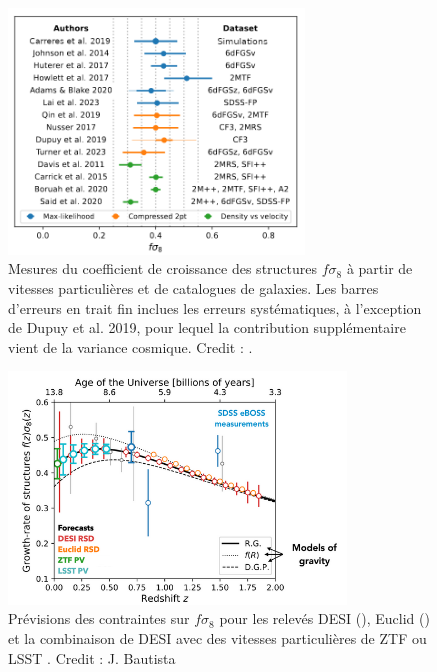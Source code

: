 \documentclass{book}
\begin{document}
\begin{figure}
    \centering
    \includegraphics[width=0.7\textwidth]{figures/Carreres_fig_11.png}
    \caption{Mesures du coefficient de croissance des structures $f\sigma_8$ à partir de vitesses particulières et de catalogues de galaxies. Les barres d'erreurs en trait fin inclues les erreurs systématiques, à l'exception de Dupuy et al. 2019, pour lequel la contribution supplémentaire vient de la variance cosmique. Credit : 
    \cite{carreres_growth-rate_2023}.}
    \label{fig:carreres_11}
\end{figure}

\begin{figure}
    \centering
    \includegraphics[width=0.8\textwidth]{figures/fs8.png}
    \caption{Prévisions des contraintes sur $f\sigma_8$ pour les relevés DESI (\cite{hahn_desi_2023}), Euclid (\cite{euclid_collaboration_euclid_2024}) et la combinaison de DESI avec des vitesses particulières de ZTF \cite{carreres_growth-rate_2023} ou LSST \cite{howlett_2mtf_2017}. Credit : J. Bautista}
    \label{fig:fs8}
\end{figure}
\end{document}
